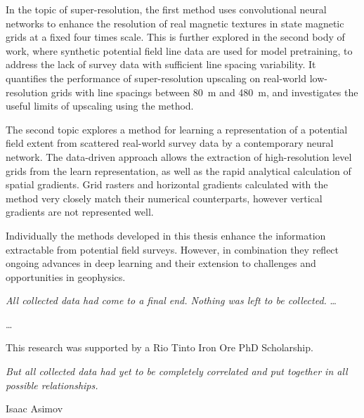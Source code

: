 \documentclass[12pt,a4paper,notitlepage]{report} %
\begin{document}
In the topic of super-resolution, the first method uses convolutional neural networks to enhance the resolution of real magnetic textures in state magnetic grids at a fixed four times scale.
This is further explored in the second body of work, where synthetic potential field line data are used for model pretraining, to address the lack of survey data with sufficient line spacing variability.
It quantifies the performance of super-resolution upscaling on real-world low-resolution grids with line spacings between \SI{80}{\m} and \SI{480}{\m}, and investigates the useful limits of upscaling using the method.

The second topic explores a method for learning a representation of a potential field extent from scattered real-world survey data by a contemporary neural network.
The data-driven approach allows the extraction of high-resolution level grids from the learn representation, as well as the rapid analytical calculation of spatial gradients.
Grid rasters and horizontal gradients calculated with the method very closely match their numerical counterparts, however vertical gradients are not represented well.

Individually the methods developed in this thesis enhance the information extractable from potential field surveys.
However, in combination they reflect ongoing advances in deep learning and their extension to challenges and opportunities in geophysics.

\vfill{}
\epigraph{\emph{All collected data had come to a final end. Nothing was left to be collected.} \dots}{}

\newpage{}
\dots{}

This research was supported by a Rio Tinto Iron Ore PhD Scholarship.

\vfill{}
\epigraph{\emph{But all collected data had yet to be completely correlated and put together in all possible relationships.}}{Isaac Asimov}

\newpage{}
\tableofcontents{}
\listoffigures{}
\end{document}
